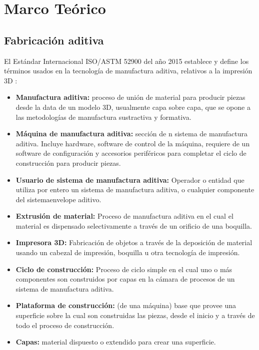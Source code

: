 

\chapter{Marco Te\'orico}
\label{cap:preliminares}



\section{Fabricaci\'on aditiva}

El Estándar Internacional ISO/ASTM 52900 del año 2015 establece y define los términos usados en la tecnología de manufactura aditiva, relativos a la impresión 3D \citep{iso2015}:

\begin{itemize}
\item \textbf{Manufactura aditiva:} proceso de unión de material para producir piezas desde la data de un modelo 3D, usualmente capa sobre capa, que se opone a las metodologías de manufactura sustractiva y formativa.
\item \textbf{Máquina de manufactura aditiva:} sección de n sistema de manufactura aditiva. Incluye hardware, software de control de la máquina, requiere de un software de configuración y accesorios periféricos para completar el ciclo de construcción para producir piezas.
\item \textbf{Usuario de sistema de manufactura aditiva:} Operador o entidad que utiliza por entero un sistema de manufactura aditiva, o cualquier componente del sistemaenvelope aditivo.
\item \textbf{Extrusión de material:} Proceso de manufactura aditiva en el cual el material es dispensado selectivamente a través de un orificio de una boquilla. 
\item \textbf{Impresora 3D:} Fabricación de objetos a través de la deposición de material usando un cabezal de impresión, boquilla u otra tecnología de impresión.
\item \textbf{Ciclo de construcción:}  Proceso de ciclo simple en el cual uno o más componentes son construidos por capas en la cámara de procesos de un sistema de manufactura aditiva.
\item \textbf{Plataforma de construcción:} (de una máquina) base que provee una superficie sobre la cual son construidas las piezas, desde el inicio y a través de todo el proceso de construcción.
\item \textbf{Capas: } material dispuesto o extendido para crear una superficie.

\end{itemize}
